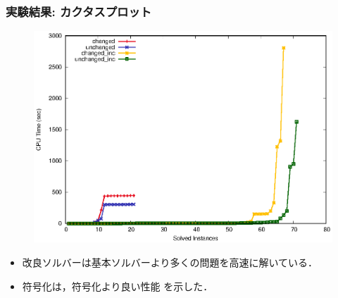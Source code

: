 \documentclass[dvipdfmx,11pt]{beamer}
\begin{document}
\begin{frame}\frametitle{実験結果: カクタスプロット}

  \begin{figure}[h]
    \centering
    \includegraphics[scale=0.7]{fig/cactus.eps}
  \end{figure}

  \begin{itemize}
    \item 改良ソルバーは基本ソルバーより多くの問題を高速に解いている．
    \item {} 符号化は，符号化より良い性能
      を示した．
  \end{itemize}
  
\end{frame}
\end{document}
